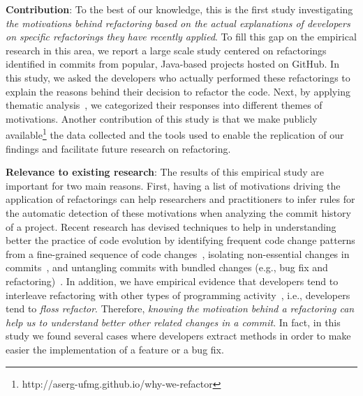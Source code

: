 \noindent\textbf{Contribution}:
To the best of our knowledge, this is the first study investigating \textit{the motivations behind refactoring based on the actual explanations of developers on specific refactorings they have recently applied}.
To fill this gap on the empirical research in this area, 
we report a large scale study centered on \studiedRefactorings refactorings identified in \commitsWithRefactoringAndResponse commits  
from \studiedProjects popular, Java-based projects hosted on GitHub. In this study,
we asked the developers who actually performed these refactorings to explain the reasons 
behind their decision to refactor the code.
Next, by applying thematic analysis~\citep{Cruzes:2011}, we categorized their responses into different themes of motivations. 
Another contribution of this study is that we make publicly available\footnote{http://aserg-ufmg.github.io/why-we-refactor} the data collected and the tools used to enable the replication of our findings and facilitate future research on refactoring.


\noindent\textbf{Relevance to existing research}: The results of this empirical study are important for two main reasons.
First, having a list of motivations driving the application of refactorings can help researchers and practitioners
to infer rules for the automatic detection of these motivations when analyzing the commit history of a project.
Recent research has devised techniques to help in understanding better the practice of code evolution by
identifying frequent code change patterns from a fine-grained sequence of code changes~\citep{Negara:2014},
isolating non-essential changes in commits~\citep{Kawrykow:2011}, and
untangling commits with bundled changes (e.g., bug fix and refactoring)~\citep{Dias:2015}.
In addition, we have empirical evidence that developers tend to interleave refactoring with other types of programming activity~\citep{MurphyHill2012}, i.e., developers tend to \textit{floss refactor}.
Therefore, \textit{knowing the motivation behind a refactoring can help us to understand better other related changes in a commit}.
In fact, in this study we found several cases where developers extract methods in order to make easier the implementation of a feature or a bug fix.

